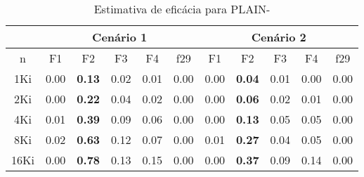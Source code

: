 \begin{table}[ht]
    \tiny
    \centering
    \caption{Estimativa de eficácia para PLAIN-\label{minus-plain-effect}}
    \begin{tabular}{c|ccccc|ccccc}
        \toprule
        & \multicolumn{5}{c}{Cenário 1} & \multicolumn{5}{c}{Cenário 2} \\
        \midrule
        n    &  F1               &  F2    &  F3    &  F4    &  f29              &  F1               &  F2    &  F3    &  F4    &  f29             \\
        \midrule
        1Ki  &  \notfound{}0.00  &  \textbf{0.13}  &  0.02  &  0.01  &  \notfound{}0.00  &  \notfound{}0.00  &  \textbf{0.04}  &  0.01  &  0.00  &  \notfound{}0.00 \\
        2Ki  &  \notfound{}0.00  &  \textbf{0.22}  &  0.04  &  0.02  &  \notfound{}0.00  &  \notfound{}0.00  &  \textbf{0.06}  &  0.02  &  0.01  &  \notfound{}0.00 \\
        4Ki  &  0.01             &  \textbf{0.39}  &  0.09  &  0.06  &  \notfound{}0.00  &  \notfound{}0.00  &  \textbf{0.13}  &  0.05  &  0.05  &  \notfound{}0.00 \\
        8Ki  &  0.02             &  \textbf{0.63}  &  0.12  &  0.07  &  \notfound{}0.00  &  0.01             &  \textbf{0.27}  &  0.04  &  0.05  &  \notfound{}0.00 \\
        16Ki &  \notfound{}0.00  &  \textbf{0.78}  &  0.13  &  0.15  &  \notfound{}0.00  &  \notfound{}0.00  &  \textbf{0.37}  &  0.09  &  0.14  &  \notfound{}0.00 \\
        \bottomrule
    \end{tabular}
\end{table}
